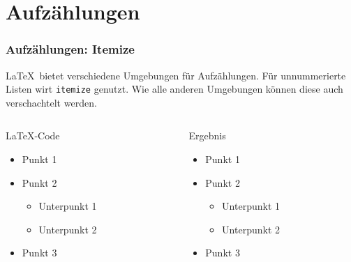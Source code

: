 \section{Aufzählungen}
\begin{frame}[fragile]
    \frametitle{Aufzählungen: Itemize}
    \LaTeX \ bietet verschiedene Umgebungen für Aufzählungen. Für unnummerierte Listen wirt \texttt{itemize} genutzt.
    Wie alle anderen Umgebungen können diese auch verschachtelt werden.
    \begin{columns}[t]
        \begin{column}{0.47\textwidth}
            \begin{block}{\LaTeX-Code}
                \begin{lstverbatim}
                \begin{itemize}
                    \item Punkt 1
                    \item Punkt 2
                        \begin{itemize}%
                            \item Unterpunkt 1
                            \item Unterpunkt 2
                        \end{itemize}
                    \item Punkt 3
                \end{itemize}
                \end{lstverbatim}
            \end{block}
        \end{column}
        \begin{column}{0.47\textwidth}
            \begin{block}{Ergebnis}
                \begin{itemize}
                    \item Punkt 1
                    \item Punkt 2
                        \begin{itemize}  %
                            \item Unterpunkt 1
                            \item Unterpunkt 2
                        \end{itemize}
                    \item Punkt 3
                \end{itemize}
            \end{block} 
        \end{column}
    \end{columns}
\end{frame}


